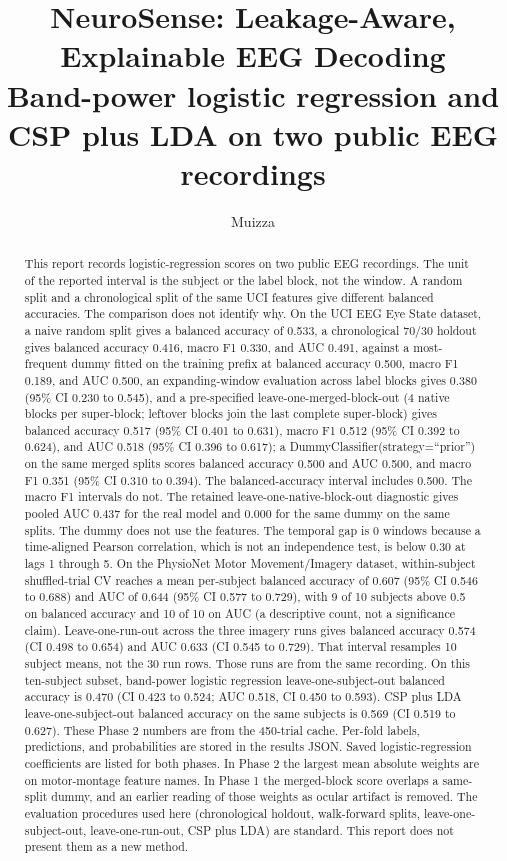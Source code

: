 \documentclass[11pt]{article}
\title{\textbf{NeuroSense: Leakage-Aware, Explainable EEG Decoding}\\[0.3em]
\large Band-power logistic regression and CSP plus LDA on two public EEG recordings}
\author{Muizza}
\date{}
\begin{document}
\maketitle

\begin{abstract}
\noindent This report records logistic-regression scores on two public EEG recordings. The unit of the reported interval is the subject or the label block, not the window. A random split and a chronological split of the same UCI features give different balanced accuracies. The comparison does not identify why. On the UCI EEG Eye State dataset, a naive random split gives a balanced accuracy of 0.533, a chronological 70/30 holdout gives balanced accuracy 0.416, macro F1 0.330, and AUC 0.491, against a most-frequent dummy fitted on the training prefix at balanced accuracy 0.500, macro F1 0.189, and AUC 0.500, an expanding-window evaluation across label blocks gives 0.380 (95\% CI 0.230 to 0.545), and a pre-specified leave-one-merged-block-out (4 native blocks per super-block; leftover blocks join the last complete super-block) gives balanced accuracy 0.517 (95\% CI 0.401 to 0.631), macro F1 0.512 (95\% CI 0.392 to 0.624), and AUC 0.518 (95\% CI 0.396 to 0.617); a DummyClassifier(strategy=``prior'') on the same merged splits scores balanced accuracy 0.500 and AUC 0.500, and macro F1 0.351 (95\% CI 0.310 to 0.394). The balanced-accuracy interval includes 0.500. The macro F1 intervals do not. The retained leave-one-native-block-out diagnostic gives pooled AUC 0.437 for the real model and 0.000 for the same dummy on the same splits. The dummy does not use the features. The temporal gap is 0 windows because a time-aligned Pearson correlation, which is not an independence test, is below 0.30 at lags 1 through 5. On the PhysioNet Motor Movement/Imagery dataset, within-subject shuffled-trial CV reaches a mean per-subject balanced accuracy of 0.607 (95\% CI 0.546 to 0.688) and AUC of 0.644 (95\% CI 0.577 to 0.729), with 9 of 10 subjects above 0.5 on balanced accuracy and 10 of 10 on AUC (a descriptive count, not a significance claim). Leave-one-run-out across the three imagery runs gives balanced accuracy 0.574 (CI 0.498 to 0.654) and AUC 0.633 (CI 0.545 to 0.729). That interval resamples 10 subject means, not the 30 run rows. Those runs are from the same recording. On this ten-subject subset, band-power logistic regression leave-one-subject-out balanced accuracy is 0.470 (CI 0.423 to 0.524; AUC 0.518, CI 0.450 to 0.593). CSP plus LDA leave-one-subject-out balanced accuracy on the same subjects is 0.569 (CI 0.519 to 0.627). These Phase 2 numbers are from the 450-trial cache. Per-fold labels, predictions, and probabilities are stored in the results JSON. Saved logistic-regression coefficients are listed for both phases. In Phase 2 the largest mean absolute weights are on motor-montage feature names. In Phase 1 the merged-block score overlaps a same-split dummy, and an earlier reading of those weights as ocular artifact is removed. The evaluation procedures used here (chronological holdout, walk-forward splits, leave-one-subject-out, leave-one-run-out, CSP plus LDA) are standard. This report does not present them as a new method.
\end{abstract}
\end{document}

